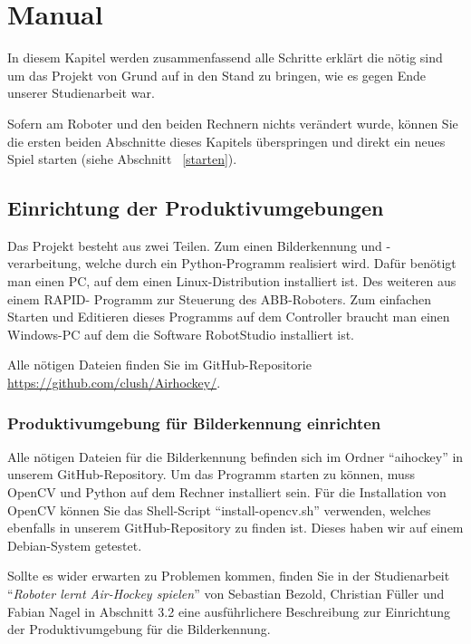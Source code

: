 
\chapter{Manual}
\label{manual}

In diesem Kapitel werden zusammenfassend alle Schritte erklärt die nötig sind um das Projekt von Grund auf in den Stand zu bringen, wie es gegen Ende unserer Studienarbeit war.

Sofern am Roboter und den beiden Rechnern nichts verändert wurde, können Sie die ersten beiden Abschnitte dieses Kapitels überspringen und direkt ein neues Spiel starten (siehe Abschnitt ~\ref{starten}). 

\section{Einrichtung der Produktivumgebungen}

Das Projekt besteht aus zwei Teilen. Zum einen Bilderkennung und -verarbeitung, welche durch ein Python-Programm realisiert wird. Dafür benötigt man einen PC, auf dem einen Linux-Distribution installiert ist. Des weiteren aus einem RAPID- Programm zur Steuerung des ABB-Roboters. Zum einfachen Starten und Editieren dieses Programms auf dem Controller braucht man einen Windows-PC auf dem die Software RobotStudio installiert ist. 

Alle nötigen Dateien finden Sie im GitHub-Repositorie \href{https://github.com/clush/Airhockey/}{https://github.com/clush/Airhockey/}.  

\subsection{Produktivumgebung für Bilderkennung einrichten}
Alle nötigen Dateien für die Bilderkennung befinden sich im Ordner \enquote{aihockey} in unserem GitHub-Repository. Um das Programm starten zu können, muss OpenCV und Python auf dem Rechner installiert sein. Für die Installation von OpenCV können Sie das Shell-Script \enquote{install-opencv.sh} verwenden, welches ebenfalls in unserem GitHub-Repository zu finden ist. Dieses haben wir auf einem Debian-System getestet. 

Sollte es wider erwarten zu Problemen kommen, finden Sie in der Studienarbeit \enquote{\textit{Roboter lernt Air-Hockey spielen}} von Sebastian Bezold, Christian Füller und Fabian Nagel in Abschnitt 3.2 eine ausführlichere Beschreibung zur Einrichtung der Produktivumgebung für die Bilderkennung.

